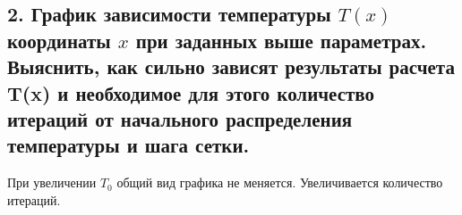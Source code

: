\documentclass[a4paper,oneside,12pt]{extreport}
\begin{document}





\clearpage

\subsection{2. График зависимости температуры $T(x)$ координаты $x$ при заданных выше параметрах.
Выяснить, как сильно зависят результаты расчета T(x) и необходимое для
этого количество итераций от начального распределения температуры и шага сетки.}

\begin{figure}[ht!]
\end{figure}

При увеличении $T_0$ общий вид графика не меняется. 
Увеличивается количество итераций.


\end{document}
